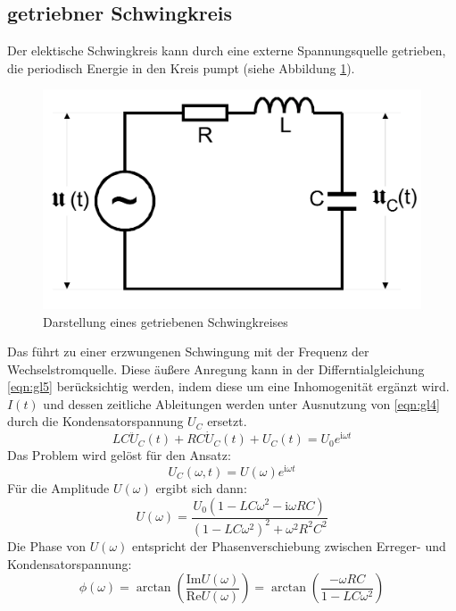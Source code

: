 \subsection{getriebner Schwingkreis}
\label{sec:getrieben}
Der elektische Schwingkreis kann durch eine externe Spannungsquelle getrieben, die periodisch Energie in den Kreis pumpt (siehe Abbildung \ref{fig:abb4}).
\begin{figure}
  \centering
  \includegraphics[width=\textwidth]{abb4.jpg}
  \caption{Darstellung eines getriebenen Schwingkreises\cite{manualV354}}
  \label{fig:abb4}
\end{figure}
Das führt zu einer erzwungenen Schwingung mit der Frequenz der Wechselstromquelle.
Diese äußere Anregung kann in der Differntialgleichung \eqref{eqn:gl5} berücksichtig werden, indem diese um eine Inhomogenität ergänzt wird.
$I(t)$ und dessen zeitliche Ableitungen werden unter Ausnutzung von \eqref{eqn:gl4} durch die Kondensatorspannung $U_C$ ersetzt.
\begin{equation}
  LC\ddot{U}_C(t) + RC\dot{U}_C(t) + U_C(t) = U_0e^{\text{i}\omega t}
  \label{eqn:gl15}
\end{equation}
Das Problem wird gelöst für den Ansatz:
\begin{equation}
  U_C(\omega,t) = U(\omega)e^{\text{i}\omega t}
  \label{eqn:gl16}
\end{equation}
Für die Amplitude $U(\omega)$ ergibt sich dann:
\begin{equation}
  U(\omega) = \frac{U_0(1 - LC \omega^2 - \text{i}\omega RC)}{(1 - LC\omega^2)^2 + \omega^2 R^2 C^2}
  \label{eqn:gl17}
\end{equation}
Die Phase von $U(\omega)$ entspricht der Phasenverschiebung zwischen Erreger- und Kondensatorspannung:
\begin{equation}
  \phi(\omega) = \arctan\left(\frac{\text{Im}U(\omega)}{\text{Re}U(\omega)}\right) = \arctan\left(\frac{-\omega RC}{1 - LC\omega^2}\right)
  \label{eqn:gl18}
\end{equation}
